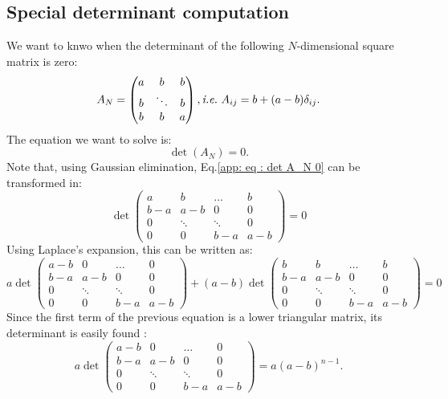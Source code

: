 \documentclass[12pt]{report}
\begin{document}
\subsection{Special determinant computation}
We want to knwo when the determinant of the following $N$-dimensional square matrix is zero:
\begin{equation}
A_N = \begin{pmatrix}
a & b & b  \\
b & \ddots & b  \\
b & b & a
\end{pmatrix}, \textit{i.e.} \ A_{ij} = b+(a-b)\delta_{ij}.
\end{equation}
The equation we want to solve is:
\begin{equation}
\det\left(A_N\right)=0. \label{app: eq : det A_N 0}
\end{equation}
Note that, using Gaussian elimination, Eq.\eqref{app: eq : det A_N 0} can be transformed in:
\begin{equation}
\det\begin{pmatrix}
a & b & \dots & b \\
b-a & a-b & 0 & 0 \\
0 & \ddots & \ddots & 0 \\
0 & 0 & b-a & a-b
\end{pmatrix}=0
\end{equation}
Using Laplace's expansion, this can be written as:
\begin{equation}
 a \det\begin{pmatrix}
a-b & 0 & \dots & 0 \\
b-a & a-b & 0 & 0 \\
0 & \ddots & \ddots & 0 \\
0 & 0 & b-a & a-b
\end{pmatrix}+(a-b)
\det\begin{pmatrix}
b & b & \dots & b \\
b-a & a-b & 0 & 0 \\
0 & \ddots & \ddots & 0 \\
0 & 0 & b-a & a-b
\end{pmatrix}=0 \label{app : eq : laplace expansion}
\end{equation}
Since the first term of the previous equation is a lower triangular matrix, its determinant is easily found :
\begin{equation}
a \det\begin{pmatrix}
a-b & 0 & \dots & 0 \\
b-a & a-b & 0 & 0 \\
0 & \ddots & \ddots & 0 \\
0 & 0 & b-a & a-b
\end{pmatrix} = a\left(a-b\right)^{n-1}.
\end{equation}
\end{document}
